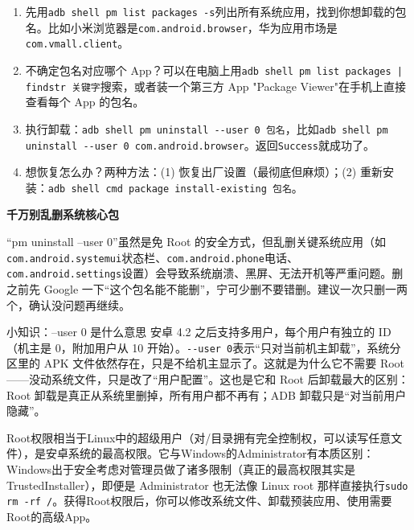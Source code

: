 \begin{enumerate}
  \item 先用\texttt{adb shell pm list packages -\allowbreak s}列出所有系统应用，找到你想卸载的包名。比如小米浏览器是\texttt{com.\allowbreak android.\allowbreak browser}，华为应用市场是\texttt{com.\allowbreak vmall.\allowbreak client}。
  \item 不确定包名对应哪个 App？可以在电脑上用\texttt{adb shell pm list packages | findstr 关键字}搜索，或者装一个第三方 App "Package Viewer"在手机上直接查看每个 App 的包名。
  \item 执行卸载：\texttt{adb shell pm uninstall -\allowbreak -\allowbreak user 0 包名}，比如\texttt{adb shell pm uninstall -\allowbreak -\allowbreak user 0 com.\allowbreak android.\allowbreak browser}。返回\texttt{Success}就成功了。
  \item 想恢复怎么办？两种方法：(1) 恢复出厂设置（最彻底但麻烦）；(2) 重新安装：\texttt{adb shell cmd package install-\allowbreak existing 包名}。
\end{enumerate}

\textbf{千万别乱删系统核心包}\par

“pm uninstall --user 0”虽然是免 Root 的安全方式，但乱删关键系统应用（如\texttt{com.\allowbreak android.\allowbreak systemui}状态栏、\texttt{com.\allowbreak android.\allowbreak phone}电话、\texttt{com.\allowbreak android.\allowbreak settings}设置）会导致系统崩溃、黑屏、无法开机等严重问题。删之前先 Google 一下“这个包名能不能删”，宁可少删不要错删。建议一次只删一两个，确认没问题再继续。

\begin{tcbinfo}{小知识：--user 0 是什么意思}
安卓 4.2 之后支持多用户，每个用户有独立的 ID（机主是 0，附加用户从 10 开始）。\texttt{-\allowbreak -\allowbreak user 0}表示“只对当前机主卸载”，系统分区里的 APK 文件依然存在，只是不给机主显示了。这就是为什么它不需要 Root——没动系统文件，只是改了“用户配置”。这也是它和 Root 后卸载最大的区别：Root 卸载是真正从系统里删掉，所有用户都不再有；ADB 卸载只是“对当前用户隐藏”。

\end{tcbinfo}


Root权限相当于Linux中的超级用户（对/目录拥有完全控制权，可以读写任意文件），是安卓系统的最高权限。它与Windows的Administrator有本质区别：Windows出于安全考虑对管理员做了诸多限制（真正的最高权限其实是 TrustedInstaller），即便是 Administrator 也无法像 Linux root 那样直接执行\texttt{sudo rm -\allowbreak rf /\allowbreak *}。获得Root权限后，你可以修改系统文件、卸载预装应用、使用需要Root的高级App。

